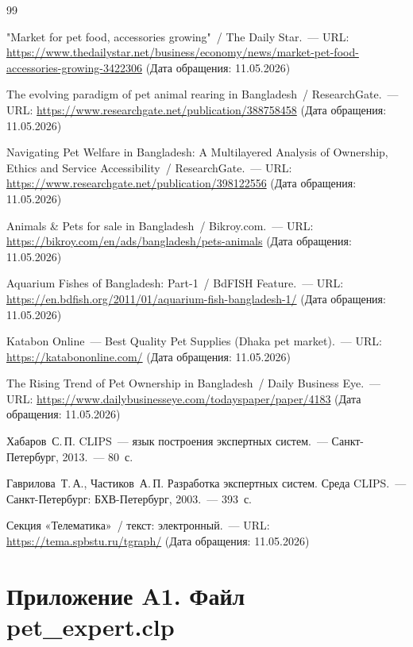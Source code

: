 \documentclass[a4paper,final]{article}
\begin{document}
\clearpage
{}
\begin{thebibliography}{99}

	"Market for pet food, accessories growing"~/ The Daily Star.~---
	URL: \url{https://www.thedailystar.net/business/economy/news/market-pet-food-accessories-growing-3422306}
	(Дата обращения: 11.05.2026)

	The evolving paradigm of pet animal rearing in Bangladesh~/ ResearchGate.~---
	URL: \url{https://www.researchgate.net/publication/388758458}
	(Дата обращения: 11.05.2026)

	Navigating Pet Welfare in Bangladesh: A Multilayered Analysis of Ownership, Ethics and Service Accessibility~/ ResearchGate.~---
	URL: \url{https://www.researchgate.net/publication/398122556}
	(Дата обращения: 11.05.2026)

	Animals \& Pets for sale in Bangladesh~/ Bikroy.com.~---
	URL: \url{https://bikroy.com/en/ads/bangladesh/pets-animals}
	(Дата обращения: 11.05.2026)

	Aquarium Fishes of Bangladesh: Part-1~/ BdFISH Feature.~---
	URL: \url{https://en.bdfish.org/2011/01/aquarium-fish-bangladesh-1/}
	(Дата обращения: 11.05.2026)

	Katabon Online~--- Best Quality Pet Supplies (Dhaka pet market).~---
	URL: \url{https://katabononline.com/}
	(Дата обращения: 11.05.2026)

	The Rising Trend of Pet Ownership in Bangladesh~/ Daily Business Eye.~---
	URL: \url{https://www.dailybusinesseye.com/todayspaper/paper/4183}
	(Дата обращения: 11.05.2026)

	Хабаров~С.\,П. CLIPS~--- язык построения экспертных систем.~---
	Санкт-Петербург, 2013.~--- 80~с.

	Гаврилова~Т.\,А., Частиков~А.\,П. Разработка экспертных систем. Среда CLIPS.~---
	Санкт-Петербург: БХВ-Петербург, 2003.~--- 393~с.

	Секция «Телематика»~/ текст: электронный.~---
	URL: \url{https://tema.spbstu.ru/tgraph/}
	(Дата обращения: 11.05.2026)

\end{thebibliography}


\clearpage
\section*{Приложение A1. Файл pet\_expert.clp}
\label{app:clips}

\end{document}
